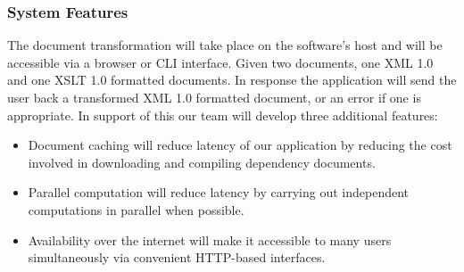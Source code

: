


\subsubsection{System Features}


The document transformation will take place on the software's host and will be accessible via a browser or CLI interface.
Given two documents, one XML 1.0 and one XSLT 1.0 formatted documents.
In response the application will send the user back a transformed XML 1.0 formatted document, or an error if one is appropriate.
In support of this our team will develop three additional features:

\begin{itemize}
  \item Document caching will reduce latency of our application by reducing the cost involved in downloading and compiling dependency documents.
  \item Parallel computation will reduce latency by carrying out independent computations in parallel when possible.
  \item Availability over the internet will make it accessible to many users simultaneously via convenient HTTP-based interfaces.
\end{itemize}

